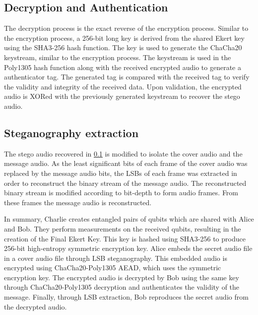 \documentclass[a4paper]{cas-sc}
\begin{document}
\subsection{Decryption and Authentication}
\label{sec:chacha20poly1305decryption}
The decryption process is the exact reverse of the encryption process. Similar to the encryption process, a 256-bit long key is derived from the shared Ekert key using the SHA3-256 hash function. The key is used to generate the ChaCha20 keystream, similar to the encryption process. The keystream is used in the Poly1305 hash function along with the received encrypted audio to generate a authenticator tag. The generated tag is compared with the received tag to verify the validity and integrity of the received data. Upon validation, the encrypted audio is XORed with the previously generated keystream to recover the stego audio.
\subsection{Steganography extraction}
\label{sec:stegoExtract}
The stego audio recovered in \ref{sec:chacha20poly1305decryption} is modified to isolate the cover audio and the message audio. As the least significant bits of each frame of the cover audio was replaced by the message audio bits, the LSBs of each frame was extracted in order to reconstruct the binary stream of the message audio. The reconstructed binary stream is modified according to bit-depth to form audio frames. From these frames the message audio is reconstructed.

In summary, Charlie creates entangled pairs of qubits which are shared with Alice and Bob. They perform measurements on the received qubits, resulting in the creation of the Final Ekert Key. This key is hashed using SHA3-256 to produce 256-bit high-entropy symmetric encryption key. Alice embeds the secret audio file in a cover audio file through LSB steganography. This embedded audio is encrypted using ChaCha20-Poly1305 AEAD, which uses the symmetric encryption key. The encrypted audio is decrypted by Bob using the same key through ChaCha20-Poly1305 decryption and authenticates the validity of the message. Finally, through LSB extraction, Bob reproduces the secret audio from the decrypted audio.
\end{document}
